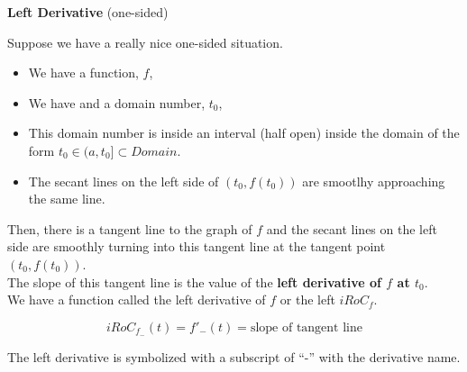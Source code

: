 \documentclass{ximera}
\begin{document}
\begin{definition} \textbf{\textcolor{green!50!black}{Left Derivative}}  (one-sided) 


Suppose we have a really nice one-sided situation.


\begin{itemize}
\item We have a function, $f$, 
\item We have and a domain number, $t_0$, 
\item This domain number is inside an interval (half open) inside the domain of the form  $t_0 \in (a, t_0] \subset Domain$. 
\item The secant lines on the left side of $(t_0, f(t_0))$ are smootlhy approaching the same line.
\end{itemize}

Then, there is a tangent line to the graph of $f$ and the secant lines on the left side are smoothly turning into this tangent line at the tangent point $(t_0, f(t_0))$. \\

The slope of this tangent line is the value of the \textbf{left derivative of $f$ at $t_0$}. \\

We have a function called the left derivative of $f$ or the left $iRoC_f$.

\[
iRoC_{f_{-}}(t) =f'_{-}(t) = \text{slope of tangent line}
\]

The left derivative is symbolized with a subscript of ``-'' with the derivative name. \\
 

\end{definition}
\end{document}

